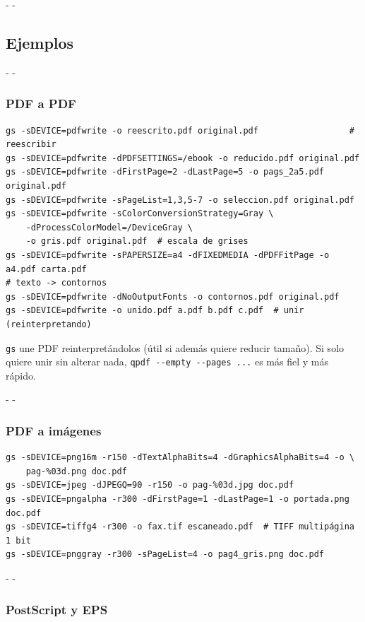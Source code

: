 \documentclass[11pt,a4paper]{article}
\makeatletter
\newcommand{\necesitaespacio}[1]{\par\penalty-100\begingroup
	\setlength{\dimen@}{#1}\dimen@ii\pagegoal\advance\dimen@ii-\pagetotal
	\ifdim\dimen@>\dimen@ii\ifdim\dimen@ii>\z@\vfil\fi\penalty-\@M\fi\endgroup}
\newcommand{\cmd}[1]{\texttt{\textcolor{colcmd}{#1}}}      %
\makeatother
\begin{document}
	\necesitaespacio{10\baselineskip}
	\subsection{Ejemplos}
	
	\necesitaespacio{6\baselineskip}
	\subsubsection{PDF a PDF}
	
	\begin{lstlisting}
gs -sDEVICE=pdfwrite -o reescrito.pdf original.pdf                  # reescribir
gs -sDEVICE=pdfwrite -dPDFSETTINGS=/ebook -o reducido.pdf original.pdf
gs -sDEVICE=pdfwrite -dFirstPage=2 -dLastPage=5 -o pags_2a5.pdf original.pdf
gs -sDEVICE=pdfwrite -sPageList=1,3,5-7 -o seleccion.pdf original.pdf
gs -sDEVICE=pdfwrite -sColorConversionStrategy=Gray \
    -dProcessColorModel=/DeviceGray \
    -o gris.pdf original.pdf  # escala de grises
gs -sDEVICE=pdfwrite -sPAPERSIZE=a4 -dFIXEDMEDIA -dPDFFitPage -o a4.pdf carta.pdf
# texto -> contornos
gs -sDEVICE=pdfwrite -dNoOutputFonts -o contornos.pdf original.pdf
gs -sDEVICE=pdfwrite -o unido.pdf a.pdf b.pdf c.pdf  # unir (reinterpretando)
\end{lstlisting}
	
	\begin{nota}
		\cmd{gs} une PDF reinterpretándolos (útil si además quiere reducir tamaño). Si solo quiere unir sin alterar nada, \cmd{qpdf -{}-empty -{}-pages ...} es más fiel y más rápido.
	\end{nota}
	
	\necesitaespacio{6\baselineskip}
	\subsubsection{PDF a imágenes}
	
	\begin{lstlisting}
gs -sDEVICE=png16m -r150 -dTextAlphaBits=4 -dGraphicsAlphaBits=4 -o \
    pag-%03d.png doc.pdf
gs -sDEVICE=jpeg -dJPEGQ=90 -r150 -o pag-%03d.jpg doc.pdf
gs -sDEVICE=pngalpha -r300 -dFirstPage=1 -dLastPage=1 -o portada.png doc.pdf
gs -sDEVICE=tiffg4 -r300 -o fax.tif escaneado.pdf  # TIFF multipágina 1 bit
gs -sDEVICE=pnggray -r300 -sPageList=4 -o pag4_gris.png doc.pdf
\end{lstlisting}
	
	\necesitaespacio{6\baselineskip}
	\subsubsection{PostScript y EPS}
	
\end{document}
